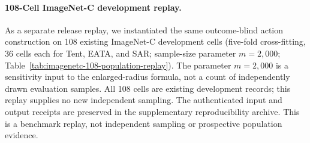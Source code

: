 \paragraph{108-Cell ImageNet-C development replay.}
As a separate release replay, we instantiated the same outcome-blind action construction
on 108 existing ImageNet-C development cells (five-fold cross-fitting, 36 cells each for
Tent, EATA, and SAR; sample-size parameter $m=2{,}000$; Table~\ref{tab:imagenetc-108-population-replay}).
The parameter $m=2{,}000$ is a sensitivity input to the enlarged-radius formula, not a count of independently drawn evaluation samples. All 108 cells are existing development records; this replay supplies no new independent sampling.
The authenticated input and output receipts are preserved in the supplementary reproducibility archive.
This is a benchmark replay, not independent sampling or prospective population evidence.

